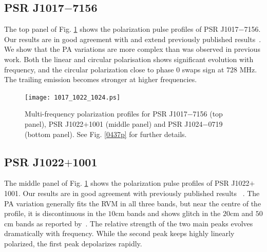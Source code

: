 \documentclass[useAMS,usenatbib]{mn2e}
\begin{document}
%
%

\subsection{PSR J1017$-$7156}

The top panel of Fig. \ref{1017p} shows the polarization pulse profiles of 
PSR J1017$-$7156.
%
Our results are in good agreement with and extend previously published 
results~\citep{Keith12}. 
%
We show that the PA variations are more complex than was observed in 
previous work.
%
%
Both the linear and circular polarisation shows significant evolution 
with frequency, and the circular polarization close to phase $0$ swaps sign 
at $728$ MHz. 
%
The trailing emission becomes stronger at higher frequencies.



\begin{figure}
\begin{center}
\texttt{[image: 1017\_1022\_1024.ps]}
\caption{Multi-frequency polarization profiles for PSR J1017$-$7156 (top 
panel), PSR J1022$+$1001 (middle panel) and PSR J1024$-$0719 (bottom panel). 
See Fig. \ref{0437p} for further details.}
\label{1017p}
\end{center}
\end{figure}

\subsection{PSR J1022$+$1001}

The middle panel of Fig. \ref{1017p} shows the polarization pulse profiles 
of PSR J1022$+$1001.
%
Our results are in good agreement with previously published results
~\citep{1022Kramer99,Stairs99,Ord04,Yan11}.
%
The PA variation generally fits the RVM in all three bands, but near the 
centre of the profile, it is discontinuous in the $10$cm bands and shows 
glitch in the $20$cm and $50$cm bands as reported by~\citet{Yan11}.
%
The relative strength of the two main peaks evolves dramatically with 
frequency.
%
While the second peak keeps highly linearly polarized, the first peak 
depolarizes rapidly.
\end{document}

